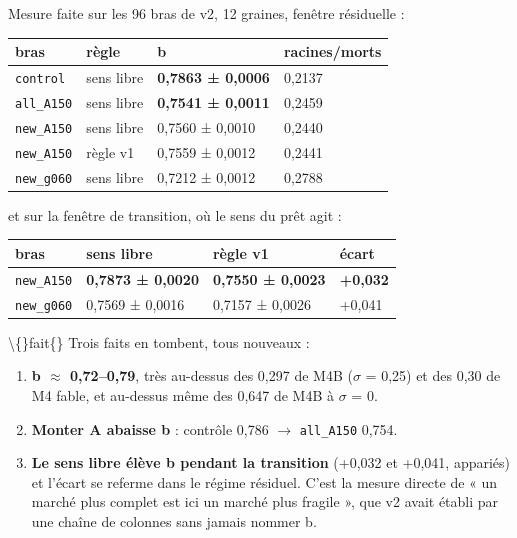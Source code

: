 \documentclass[11pt,a4paper]{article}
\newcommand{\code}[1]{\texttt{#1}}
\begin{document}
Mesure faite sur les 96 bras de v2, 12 graines, fenêtre résiduelle :

\begin{center}
\begin{tabularx}{\linewidth}{@{}llll@{}}
\toprule
\textbf{bras} & \textbf{règle} & \textbf{b} & \textbf{racines/morts} \\
\midrule
\code{control} & sens libre & \textbf{0,7863 ± 0,0006} & 0,2137 \\
\code{all\_A150} & sens libre & \textbf{0,7541 ± 0,0011} & 0,2459 \\
\code{new\_A150} & sens libre & 0,7560 ± 0,0010 & 0,2440 \\
\code{new\_A150} & règle v1 & 0,7559 ± 0,0012 & 0,2441 \\
\code{new\_g060} & sens libre & 0,7212 ± 0,0012 & 0,2788 \\
\bottomrule
\end{tabularx}
\end{center}

et sur la fenêtre de transition, où le sens du prêt agit :

\begin{center}
\begin{tabularx}{\linewidth}{@{}llll@{}}
\toprule
\textbf{bras} & \textbf{sens libre} & \textbf{règle v1} & \textbf{écart} \\
\midrule
\code{new\_A150} & \textbf{0,7873 ± 0,0020} & \textbf{0,7550 ± 0,0023} & \textbf{+0,032} \\
\code{new\_g060} & 0,7569 ± 0,0016 & 0,7157 ± 0,0026 & +0,041 \\
\bottomrule
\end{tabularx}
\end{center}

\textbackslash\{\}fait\{\} Trois faits en tombent, tous nouveaux :

\begin{enumerate}
\item \textbf{b \ensuremath{\approx} 0,72--0,79}, très au-dessus des 0,297 de M4B (\ensuremath{\sigma} = 0,25) et des 0,30 de M4 fable, et au-dessus même des 0,647 de M4B à \ensuremath{\sigma} = 0.
\item \textbf{Monter A abaisse b} : contrôle 0,786 \ensuremath{\rightarrow} \code{all\_A150} 0,754.
\item \textbf{Le sens libre élève b pendant la transition} (+0,032 et +0,041, appariés) et l'écart se referme dans le régime résiduel. C'est la mesure directe de « un marché plus complet est ici un marché plus fragile », que v2 avait établi par une chaîne de colonnes sans jamais nommer b.
\end{enumerate}
\end{document}
